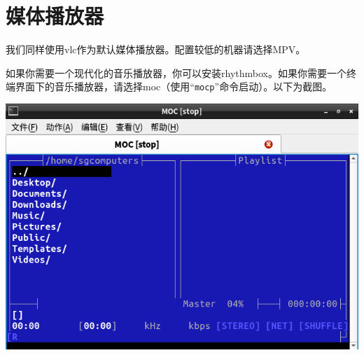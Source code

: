 \section{媒体播放器}
我们同样使用vlc作为默认媒体播放器。配置较低的机器请选择MPV。\par
如果你需要一个现代化的音乐播放器，你可以安装rhythmbox。如果你需要一个终端界面下的音乐播放器，请选择moc（使用“\verb|mocp|”命令启动）。以下为截图。
\begin{center}
	\includegraphics[scale=0.9]{pic/moc}
\end{center}
